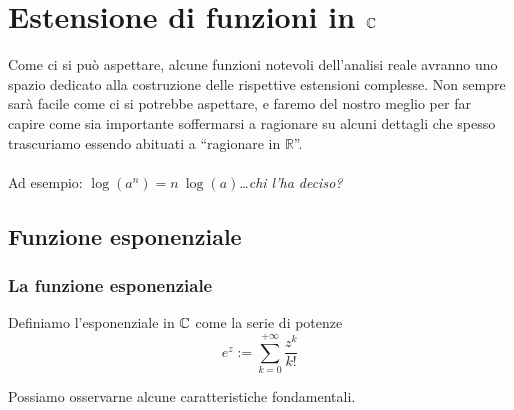 
\chapter{Estensione di funzioni in $\mathbb{C}$}
Come ci si può aspettare, alcune funzioni notevoli dell'analisi reale avranno uno spazio dedicato alla costruzione delle rispettive estensioni complesse. Non sempre sarà facile come ci si potrebbe aspettare, e faremo del nostro meglio per far capire come sia importante soffermarsi a ragionare su alcuni dettagli che spesso trascuriamo essendo abituati a \enquote{ragionare in $\mathbb{R}$}. \\ \\ Ad esempio: $\operatorname{log}(a^n)=n \ \operatorname{log}(a)$\dots \textit{chi l'ha deciso?}
\newpage
\section{Funzione esponenziale}
\subsection{\textcolor{AnComp}{\textbf{La funzione esponenziale}}}
\begin{definition}
	\label{defn:funzione-esponenziale}
	Definiamo l'esponenziale in $\mathbb{C}$ come la serie di potenze
	\begin{equation*}
		e^z := \sum^{+\infty}_{k=0} \frac{z^k}{k!}
	\end{equation*}
\end{definition}

Possiamo osservarne alcune caratteristiche fondamentali. 

